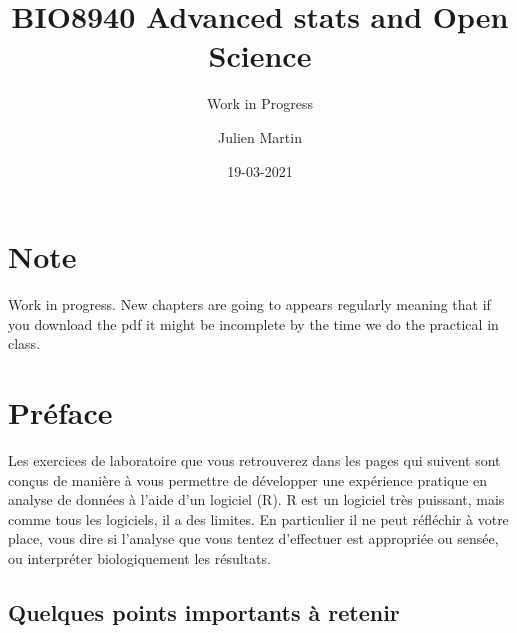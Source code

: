\documentclass[
  12pt,
]{book}
\title{BIO8940 Advanced stats and Open Science}
\subtitle{Work in Progress}
\author{Julien Martin}
\date{19-03-2021}
\makeatletter
\newenvironment{kframe}{%
\medskip{}
\setlength{\fboxsep}{.8em}
\def\at@end@of@kframe{}%
\ifinner\ifhmode%
 \def\at@end@of@kframe{\end{minipage}}%
 \begin{minipage}{\columnwidth}%
\fi\fi%
\def\FrameCommand##1{\hskip\@totalleftmargin \hskip-\fboxsep
\colorbox{incolor}{##1}\hskip-\fboxsep
    \hskip-\linewidth \hskip-\@totalleftmargin \hskip\columnwidth}%
\MakeFramed {\advance\hsize-\width
  \@totalleftmargin\z@ \linewidth\hsize
  \@setminipage}}%
{\par\unskip\endMakeFramed%
\at@end@of@kframe}
\newenvironment{rmdblock}[1]
 {
 \begin{itemize}
 \renewcommand{\labelitemi}{
   \raisebox{-.7\height}[0pt][0pt]{
     {\setkeys{Gin}{width=3em,keepaspectratio}\texttt{[image: images/icons/\#1]}}
   }
 }
 \begin{kframe}
 \setlength{\fboxsep}{1em}
 \item
 }
 {
 \end{kframe}
 \end{itemize}
 }
\newenvironment{rmdimportant}
  {\begin{rmdblock}{important}}
  {\end{rmdblock}}
\makeatother
\begin{document}
\maketitle



{
\setcounter{tocdepth}{1}
\tableofcontents
}
\hypertarget{note}{%
\chapter*{Note}\label{note}}

\begin{rmdimportant}
Work in progress. New chapters are going to appears regularly meaning that if you download the pdf it might be incomplete by the time we do the practical in class.
\end{rmdimportant}

\hypertarget{pruxe9face}{%
\chapter*{Préface}\label{pruxe9face}}

Les exercices de laboratoire que vous retrouverez dans les pages qui suivent sont conçus de manière à vous permettre de développer une expérience pratique en analyse de données à l'aide d'un logiciel (R).
R est un logiciel très puissant, mais comme tous les logiciels, il a des limites.
En particulier il ne peut réfléchir à votre place, vous dire si l'analyse que vous tentez d'effectuer est appropriée ou sensée, ou interpréter biologiquement les résultats.

\hypertarget{quelques-points-importants-uxe0-retenir}{%
\section*{Quelques points importants à retenir}\label{quelques-points-importants-uxe0-retenir}}
\end{document}
